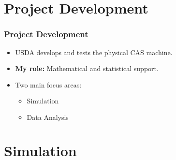 \documentclass[notheorems,11pt,compress]{beamer}
\begin{document}
\section{Project Development}

\begin{frame}
\frametitle{Project Development}
\begin{itemize}
    \item USDA develops and tests the physical CAS machine.
    \item \textbf{My role:} Mathematical and statistical support.
    \item Two main focus areas:
    \begin{itemize}
        \item Simulation
        \item Data Analysis
    \end{itemize}
\end{itemize}
\end{frame}

\section{Simulation}
\end{document}
